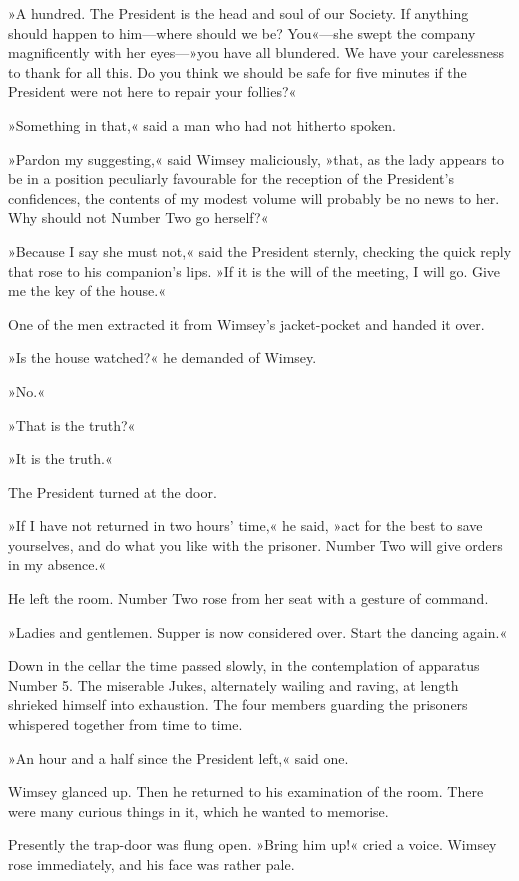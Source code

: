 »A hundred. The President is the head and soul of our Society. If anything should happen to him—where should we be? You«—she swept the company magnificently with her eyes—»you have all blundered. We have your carelessness to thank for all this. Do you think we should be safe for five minutes if the President were not here to repair your follies?«

»Something in that,« said a man who had not hitherto spoken.

»Pardon my suggesting,« said Wimsey maliciously, »that, as the lady appears to be in a position peculiarly favourable for the reception of the President's confidences, the contents of my modest volume will probably be no news to her. Why should not Number Two go herself?«

»Because I say she must not,« said the President sternly, checking the quick reply that rose to his companion's lips. »If it is the will of the meeting, I will go. Give me the key of the house.«

One of the men extracted it from Wimsey's jacket-pocket and handed it over.

»Is the house watched?« he demanded of Wimsey.

»No.«

»That is the truth?«

»It is the truth.«

The President turned at the door.

»If I have not returned in two hours' time,« he said, »act for the best to save yourselves, and do what you like with the prisoner. Number Two will give orders in my absence.«

He left the room. Number Two rose from her seat with a gesture of command.

»Ladies and gentlemen. Supper is now considered over. Start the dancing again.«

Down in the cellar the time passed slowly, in the contemplation of apparatus Number 5. The miserable Jukes, alternately wailing and raving, at length shrieked himself into exhaustion. The four members guarding the prisoners whispered together from time to time.

»An hour and a half since the President left,« said one.

Wimsey glanced up. Then he returned to his examination of the room. There were many curious things in it, which he wanted to memorise.

Presently the trap-door was flung open. »Bring him up!« cried a voice. Wimsey rose immediately, and his face was rather pale.

